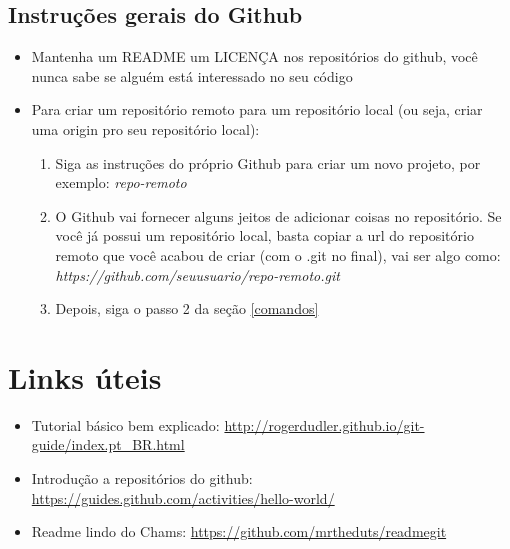 \documentclass[12pt]{article}
\begin{document}
\begin{doublespacing}
\subsection{Instruções gerais do Github}
\begin{itemize}
\item Mantenha um README um LICENÇA nos repositórios do github, você nunca sabe se alguém está interessado no seu código
\item Para criar um repositório remoto para um repositório local (ou seja, criar uma origin pro seu repositório local):
	\begin{enumerate}
	\item	 Siga as instruções do próprio Github para criar um novo projeto, por exemplo: \textit{repo-remoto}
	\item O Github vai fornecer alguns jeitos de adicionar coisas no repositório. Se você já possui um repositório local, basta copiar a url do repositório remoto que você acabou de criar (com o .git no final), vai ser algo como: \textit{https://github.com/seuusuario/repo-remoto.git}
	\item Depois, siga o passo 2 da seção \ref{comandos}
	\end{enumerate}
\end{itemize}

\section{Links úteis}
\begin{itemize}
\item Tutorial básico bem explicado: \url{http://rogerdudler.github.io/git-guide/index.pt_BR.html}
\item Introdução a repositórios do github: \url{https://guides.github.com/activities/hello-world/}
\item Readme lindo do Chams: \url{https://github.com/mrtheduts/readmegit}

\end{itemize}


\end{doublespacing}
\end{document}
